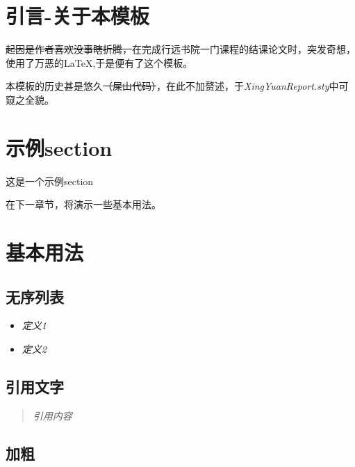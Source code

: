 \documentclass[12pt,a4paper,UTF8,fontset=fandol]{ctexart}
\begin{document}
\cover

\thispagestyle{empty} %

\newpage
\tableofcontents
\thispagestyle{empty} %

\newpage
\setcounter{page}{1} %

\section{引言-关于本模板}

\sout{起因是作者喜欢没事瞎折腾，}在完成行远书院一门课程的结课论文时，突发奇想，使用了万恶的\LaTeX ,于是便有了这个模板。

本模板的历史甚是悠久\sout{（屎山代码）}，在此不加赘述，于\textit{XingYuanReport.sty}中可窥之全貌。

\section{示例section}

这是一个示例section

在下一章节，将演示一些基本用法。

\section{基本用法}
\subsection{无序列表}
\begin{itemize}
    \item \textit{定义1}
    \item \textit{定义2}\cite{示例引用}
\end{itemize}



\subsection{引用文字}

\begin{quote}
    \textit{引用内容}\cite{示例引用}
\end{quote}

\subsection{加粗}
\end{document}
